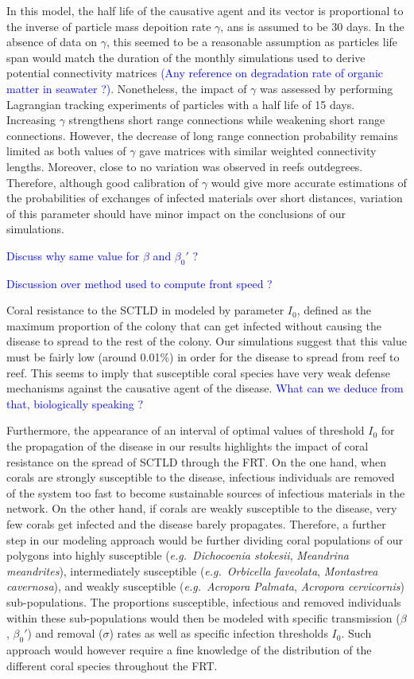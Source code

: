 \documentclass[utf8]{frontiersSCNS}
\newcommand{\eg}{{\it e.g.}\ }
\begin{document}
In this model, the half life of the causative agent and its vector is proportional to the inverse of
particle mass depoition rate $\gamma$, ans is assumed to be 30 days. In the absence of data on $\gamma$, this seemed to be a reasonable assumption as particles life span would match the duration of the monthly simulations used to derive potential connectivity matrices \textcolor{blue}{(Any reference on degradation rate of organic matter in seawater ?)}. Nonetheless, the impact of $\gamma$ was assessed by performing Lagrangian tracking experiments of particles with a half life of 15 days. Increasing $\gamma$ strengthens short range connections while weakening short range connections. However, the decrease of long range connection probability remains limited as both values of $\gamma$ gave matrices with similar weighted connectivity lengths. Moreover, close to no variation was observed in reefs outdegrees. Therefore, although good calibration of $\gamma$ would give more accurate estimations of the probabilities of exchanges of infected materials over short distances, variation of this parameter should have minor impact on the conclusions of our simulations.

\textcolor{blue}{Discuss why same value for $\beta$ and $\beta_0'$ ?}

\textcolor{blue}{Discussion over method used to compute front speed ?}


Coral resistance to the SCTLD in modeled by parameter $I_0$, defined as the maximum proportion of the colony that can get infected without causing the disease to spread to the rest of the colony. Our simulations suggest that this value must be fairly low (around 0.01\%) in order for the disease to spread from reef to reef. This seems to imply that susceptible coral species have very weak defense mechanisms against the causative agent of the disease. \textcolor{blue}{What can we deduce from that, biologically speaking ?}

Furthermore, the appearance of an interval of optimal values of threshold $I_0$ for the propagation of the disease in our results highlights the impact of coral resistance on the spread of SCTLD through the FRT. On the one hand, when corals are strongly susceptible to the disease, infectious individuals are removed of the system too fast to become sustainable sources of infectious materials in the network. On the other hand, if corals are weakly susceptible to the disease, very few corals get infected and the disease barely propagates. Therefore, a further step in our modeling approach would be further dividing coral populations of our polygons into highly susceptible (\eg \textit{Dichocoenia stokesii}, \textit{Meandrina meandrites}), intermediately susceptible (\eg \textit{Orbicella faveolata}, \textit{Montastrea cavernosa}), and weakly susceptible (\eg \textit{Acropora Palmata}, \textit{Acropora cervicornis}) sub-populations. The proportions susceptible, infectious and removed individuals within these sub-populations would then be modeled with specific transmission ($\beta$, $\beta_0'$) and removal ($\sigma$) rates as well as specific infection thresholds $I_0$. Such approach would however require a fine knowledge of the distribution of the different coral species throughout the FRT. 
\end{document}
